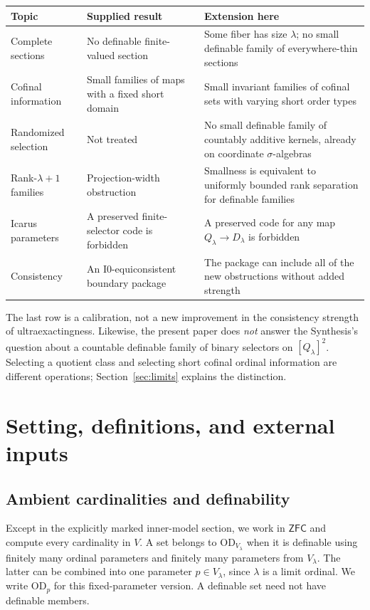\documentclass[11pt,letterpaper]{article}
\theoremstyle{definition}
\numberwithin{equation}{section}
\newcommand{\ZFC}{\mathsf{ZFC}}
\newcommand{\OD}{\mathrm{OD}}
\newcommand{\Izero}{\mathrm{I0}}
\begin{document}
\begin{center}
\small
\renewcommand{\arraystretch}{1.2}
\begin{tabularx}{\textwidth}{@{}P{.27\textwidth}P{.29\textwidth}Y@{}}
\toprule
\textbf{Topic}&\textbf{Supplied result}&\textbf{Extension here}\\\midrule
Complete sections&No definable finite-valued section&Some fiber has size $\lambda$; no small definable family of everywhere-thin sections\\
Cofinal information&Small families of maps with a fixed short domain&Small invariant families of cofinal sets with varying short order types\\
Randomized selection&Not treated&No small definable family of countably additive kernels, already on coordinate $\sigma$-algebras\\
Rank-$\lambda+1$ families&Projection-width obstruction&Smallness is equivalent to uniformly bounded rank separation for definable families\\
Icarus parameters&A preserved finite-selector code is forbidden&A preserved code for any map $Q_\lambda\to D_\lambda$ is forbidden\\
Consistency&An $\Izero$-equiconsistent boundary package&The package can include all of the new obstructions without added strength\\
\bottomrule
\end{tabularx}
\end{center}

The last row is a calibration, not a new improvement in the consistency strength of ultraexactingness. Likewise, the present paper does \emph{not} answer the Synthesis's question about a countable definable family of binary selectors on $[Q_\lambda]^2$. Selecting a quotient class and selecting short cofinal ordinal information are different operations; Section~\ref{sec:limits} explains the distinction.

\section{Setting, definitions, and external inputs}\label{sec:setting}

\subsection{Ambient cardinalities and definability}

Except in the explicitly marked inner-model section, we work in $\ZFC$ and compute every cardinality in $V$. A set belongs to $\OD_{V_\lambda}$ when it is definable using finitely many ordinal parameters and finitely many parameters from $V_\lambda$. The latter can be combined into one parameter $p\in V_\lambda$, since $\lambda$ is a limit ordinal. We write $\OD_p$ for this fixed-parameter version. A definable set need not have definable members.
\end{document}
